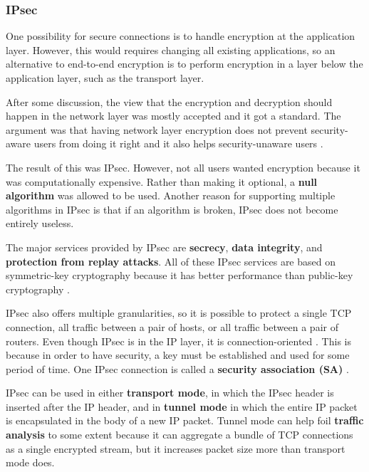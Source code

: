 \subsubsection{IPsec}

One possibility for secure connections is to handle encryption at the application layer.
However, this would requires changing all existing applications, so an alternative to end-to-end encryption is to perform encryption in a layer below the application layer, such as the transport layer.

After some discussion, the view that the encryption and decryption should happen in the network layer was mostly accepted and it got a standard.
The argument was that having network layer encryption does not prevent security-aware users from doing it right and it also helps security-unaware users \cite[p.~814]{computer-networks-tanenbaum-2012}.

The result of this was IPsec. However, not all users wanted encryption because it was computationally expensive.
Rather than making it optional, a \textbf{null algorithm} was allowed to be used.
Another reason for supporting multiple algorithms in IPsec is that if an algorithm is broken, IPsec does not become entirely useless.

The major services provided by IPsec are \textbf{secrecy}, \textbf{data integrity}, and \textbf{protection from replay attacks}.
All of these IPsec services are based on symmetric-key cryptography because it has better performance than public-key cryptography \cite[p.~814]{computer-networks-tanenbaum-2012}.

IPsec also offers multiple granularities, so it is possible to protect a single TCP connection, all traffic between a pair of hosts, or all traffic between a pair of routers.
Even though IPsec is in the IP layer, it is connection-oriented \cite[p.~814]{computer-networks-tanenbaum-2012}.
This is because in order to have security, a key must be established and used for some period of time.
One IPsec connection is called a \textbf{security association (SA)} \cite[p.~815]{computer-networks-tanenbaum-2012}.

IPsec can be used in either \textbf{transport mode}, in which the IPsec header is inserted after the IP header, and in \textbf{tunnel mode} in which the entire IP packet is encapsulated in the body of a new IP packet.
Tunnel mode can help foil \textbf{traffic analysis} to some extent because it can aggregate a bundle of TCP connections as a single encrypted stream, but it increases packet size more than transport mode does.

